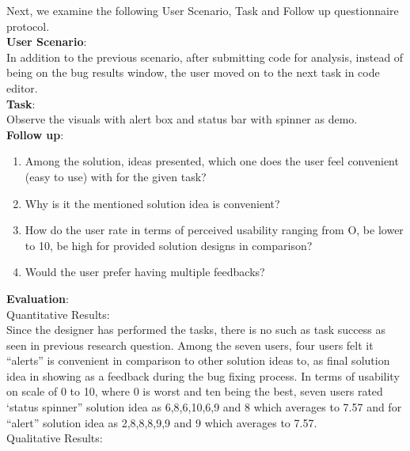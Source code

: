 Next, we examine the following User Scenario, Task and Follow up questionnaire protocol. \\

\textbf{User Scenario}: \\

In addition to the previous scenario, after submitting code for analysis, instead of being on the bug results window, the user moved on to the next task in code editor. \\

\textbf{Task}: \\

Observe the visuals with alert box and status bar with spinner as demo. \\

\textbf{Follow up}: \\

\begin{enumerate}
\item Among the solution, ideas presented, which one does the user feel convenient (easy to use) with for the given task?
\item Why is it the mentioned solution idea is convenient?
\item How do the user rate in terms of perceived usability ranging from O, be lower to 10, be high for provided solution designs in comparison?
\item Would the user prefer having multiple feedbacks?
\end{enumerate}

\textbf{Evaluation}: \\

Quantitative Results: \\

Since the designer has performed the tasks, there is no such as task success as seen in previous research question. Among the seven users, four users felt it “alerts” is convenient in comparison to other solution ideas to, as final solution idea in showing as a feedback during the bug fixing process. In terms of usability on scale of 0 to 10, where 0 is worst and ten being the best, seven users rated ‘status spinner” solution idea as 6,8,6,10,6,9 and 8 which averages to 7.57 and for “alert” solution idea as 2,8,8,8,9,9 and 9 which averages to 7.57. \\

Qualitative Results: \\

